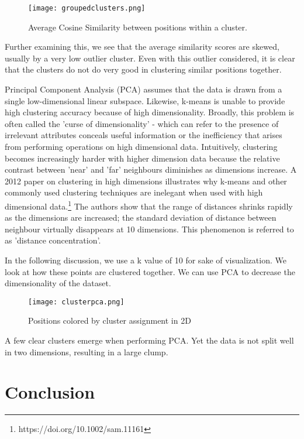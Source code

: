 \documentclass{article}
\begin{document}
\begin{figure}[h]
  \centering
  \texttt{[image: groupedclusters.png]}
  \caption{Average Cosine Similarity between positions within a cluster.}
\end{figure}

Further examining this, we see that the average similarity scores are skewed, usually by a very low outlier cluster. Even with this outlier considered, it is clear that the clusters do not do very good in clustering similar positions together.

Principal Component Analysis (PCA) assumes that the data is drawn from a single low-dimensional linear subspace. Likewise, k-means is unable to provide high clustering accuracy because of high dimensionality. Broadly, this problem is often called the 'curse of dimensionality' - which can refer to the presence of irrelevant attributes conceals useful information or the inefficiency that arises from performing operations on high dimensional data. Intuitively, clustering becomes increasingly harder with higher dimension data because the relative contrast between 'near' and 'far' neighbours diminishes as dimensions increase. A 2012 paper on clustering in high dimensions illustrates why k-means and other commonly used clustering techniques are inelegant when used with high dimensional data.\footnote{https://doi.org/10.1002/sam.11161} The authors show that the range of distances shrinks rapidly as the dimensions are increased; the standard deviation of distance between neighbour virtually disappears at 10 dimensions. This phenomenon is referred to as 'distance concentration'.

In the following discussion, we use a k value of 10 for sake of visualization. We look at how these points are clustered together. We can use PCA to decrease the dimensionality of the dataset.

\begin{figure}[h]
  \centering
  \texttt{[image: clusterpca.png]}
  \caption{Positions colored by cluster assignment in 2D}
\end{figure}

A few clear clusters emerge when performing PCA. Yet the data is not split well in two dimensions, resulting in a large clump.


\section{Conclusion}
\end{document}
